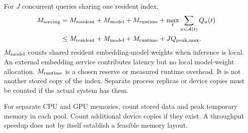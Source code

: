 For $J$ concurrent queries sharing one resident index,
\begin{equation}
\begin{aligned}
M_{\rm serving}&=M_{\rm resident}+M_{\rm model}+M_{\rm runtime}
                 +\max_t\sum_{u\in\mathcal A(t)}Q_u(t)\\
&\leq M_{\rm resident}+M_{\rm model}+M_{\rm runtime}+JQ_{\rm peak,max}.
\end{aligned}
\label{eq:serving}
\end{equation}
$M_{\rm model}$ counts shared resident embedding-model weights when inference is local. An external embedding service contributes latency but no local model-weight allocation. $M_{\rm runtime}$ is a chosen reserve or measured runtime overhead. It is not another stored
copy of the index. Separate process replicas or device copies must be counted if the actual
system has them.

For separate CPU and GPU memories, count stored data and peak temporary memory in each pool. Count additional device copies if they exist. A throughput speedup does not by itself establish a feasible memory layout.
